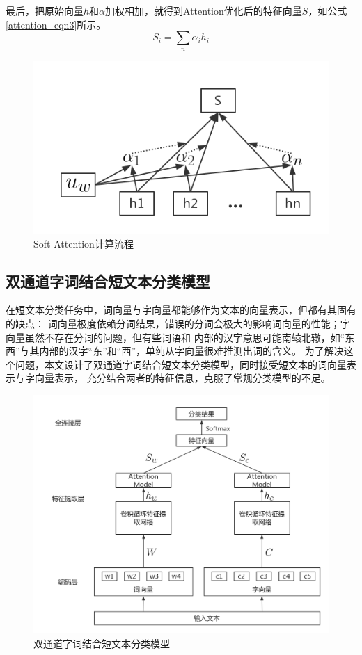 最后，把原始向量$h$和$\alpha$加权相加，就得到Attention优化后的特征向量$S$，如公式\ref{attention_eqn3}所示。
\begin{equation}
    S_i=\sum_n\alpha_ih_i
    \label{attention_eqn3}
\end{equation}
\begin{figure}[h]
    \includegraphics[scale=0.5]{picture/Attention.png}
    \caption{Soft Attention计算流程}
    \label{Soft_Attention}
\end{figure}

\subsection{双通道字词结合短文本分类模型}
在短文本分类任务中，词向量与字向量都能够作为文本的向量表示，但都有其固有的缺点：
词向量极度依赖分词结果，错误的分词会极大的影响词向量的性能；字向量虽然不存在分词的问题，但有些词语和
内部的汉字意思可能南辕北辙，如“东西”与其内部的汉字“东”和“西”，单纯从字向量很难推测出词的含义。
为了解决这个问题，本文设计了双通道字词结合短文本分类模型，同时接受短文本的词向量表示与字向量表示，
充分结合两者的特征信息，克服了常规分类模型的不足。

\begin{figure}[h]
    \includegraphics[scale=0.4]{picture/classifier.png}
    \caption{双通道字词结合短文本分类模型}
    \label{classifier}
\end{figure}

